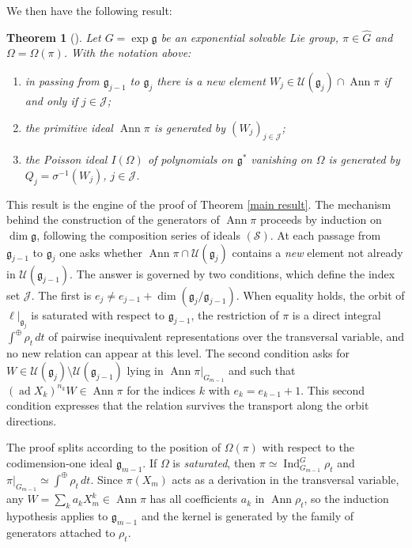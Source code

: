 \documentclass[11pt]{amsart}
\theoremstyle{plain}
\newtheorem{thm}{Theorem}[section]
\theoremstyle{definition}
\theoremstyle{remark}
\newcommand{\g}{\mathfrak g}
\newcommand{\Ann}{\operatorname{Ann}}
\begin{document}
	
	We then have the following result:
	
	
	
	\begin{thm}[{\cite[Thm.~4.6, Prop.~4.7]{Bak-Fuji-Casimir}}]\label{generators of the kernel}
		Let $G=\exp\g$ be an exponential solvable Lie group, $\pi\in\widehat G$ and $\Omega=\Omega(\pi)$. With the notation above:
		\begin{enumerate}
			\item in passing from $\g_{j-1}$ to $\g_j$ there is a new element $W_j\in\mathcal U(\g_j)\cap\Ann\pi$ if and only if $j\in\mathcal J$;
			\item the primitive ideal $\Ann\pi$ is generated by $(W_j)_{j\in\mathcal J}$;
			\item the Poisson ideal $I(\Omega)$ of polynomials on $\g^*$ vanishing on $\Omega$ is generated by $Q_j=\sigma^{-1}(W_j)$, $j\in\mathcal J$.
		\end{enumerate}
	\end{thm}
	
	This result is the engine of the proof of Theorem \ref{main result}. 
	The mechanism behind the construction of the generators of $\Ann\pi$ proceeds by induction on $\dim\g$, following the composition series of ideals $(\mathcal S)$. At each passage from $\g_{j-1}$ to $\g_j$ one asks whether $\Ann\pi\cap\mathcal U(\g_j)$ contains a \emph{new} element not already in $\mathcal U(\g_{j-1})$. The answer is governed by two conditions, which define the index set $\mathcal J$. The first is $e_j\neq e_{j-1}+\dim(\g_j/\g_{j-1})$. When equality holds, the orbit of $\ell|_{\g_j}$ is saturated with respect to $\g_{j-1}$, the restriction of $\pi$ is a direct integral $\int^\oplus\rho_t\,dt$ of pairwise inequivalent representations over the transversal variable, and no new relation can appear at this level. The second condition asks for $W\in\mathcal U(\g_j)\setminus\mathcal U(\g_{j-1})$ lying in $\Ann\pi|_{G_{m-1}}$ and such that $(\operatorname{ad}X_k)^{n_k}W\in\Ann\pi$ for the indices $k$ with $e_k=e_{k-1}+1$. This second condition expresses that the relation survives the transport along the orbit directions.
	
	The proof splits according to the position of $\Omega(\pi)$ with respect to the codimension-one ideal $\g_{m-1}$. If $\Omega$ is \emph{saturated}, then $\pi\simeq\operatorname{Ind}_{G_{m-1}}^G\rho_t$ and $\pi|_{G_{m-1}}\simeq\int^\oplus\rho_t\,dt$. Since $\pi(X_m)$ acts as a derivation in the transversal variable, any $W=\sum_k a_kX_m^k\in\Ann\pi$ has all coefficients $a_k$ in $\Ann\rho_t$, so the induction hypothesis applies to $\g_{m-1}$ and the kernel is generated by the family  of generators attached to $\rho_t$. 
	
\end{document}
